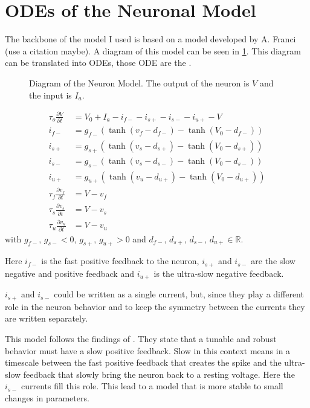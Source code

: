 \label{sec:model}
\section{ODEs of the Neuronal Model}

The backbone of the model I used is based on a model developed by A. Franci (use a citation maybe). A diagram of this model can be seen in \cref{fig:neuron_mod}. This diagram can be translated into ODEs, those ODE are the .

\begin{figure}[!htb]
    \centering
    \caption{Diagram of the Neuron Model. The output of the neuron is $V$ and the input is $I_a$.}
    \label{fig:neuron_mod}
\end{figure}

\begin{align}
    \tau_o\frac{\partial V}{\partial t} &= V_0 + I_a - i_{f-} - i_{s+} - i_{s-} - i_{u+} - V\label{eq:neur_start}\\
    i_{f-} &= g_{f-}\left(\tanh\left(v_f-d_{f-}\right) - \tanh\left(V_0-d_{f-}\right)\right)\\ 
    i_{s+} &= g_{s+}\left(\tanh\left(v_s-d_{s+}\right) - \tanh\left(V_0-d_{s+}\right)\right)\\ 
    i_{s-} &= g_{s-}\left(\tanh\left(v_s-d_{s-}\right) - \tanh\left(V_0-d_{s-}\right)\right)\\ 
    i_{u+} &= g_{u+}\left(\tanh\left(v_u-d_{u+}\right) - \tanh\left(V_0-d_{u+}\right)\right)\\ 
    \tau_f\frac{\partial v_f}{\partial t} &= V - v_f\\
    \tau_s\frac{\partial v_s}{\partial t} &= V - v_s\\
    \tau_u\frac{\partial v_u}{\partial t} &= V - v_u\label{eq:neur_end}   
\end{align}
with $g_{f-},\, g_{s-} < 0$, $g_{s+},\, g_{u+} > 0$ and $d_{f-},\, d_{s+},\, d_{s-},\, d_{u+} \in \mathbb{R}$.

Here $i_{f-}$ is the fast positive feedback to the neuron, $i_{s+}$ and $i_{s-}$ are the slow negative and positive feedback and $i_{u+}$ is the ultra-slow negative feedback.

$i_{s+}$ and $i_{s-}$ could be written as a single current, but, since they play a different role in the neuron behavior and to keep the symmetry between the currents they are written separately.

This model follows the findings of \citet{burstingSlowFeedback}. They state that a tunable and robust behavior must have a slow positive feedback. Slow in this context means in a timescale between the fast positive feedback that creates the spike and the ultra-slow feedback that slowly bring the neuron back to a resting voltage.
Here the $i_{s-}$ currents fill this role.
This lead to a model that is more stable to small changes in parameters.

